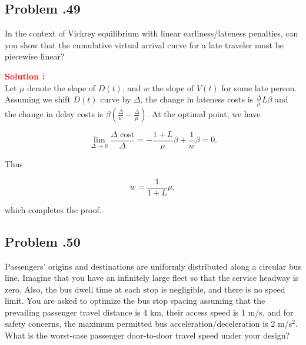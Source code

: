 \documentclass[12pt]{article}
\newcommand{\customsubsection}[1]{
  \subsection*{Problem \thesection.#1}
}
\begin{document}
\customsubsection{49}
In the context of Vickrey equilibrium with linear earliness/lateness penalties, can you show that the cumulative virtual arrival curve for a late traveler must be piecewise linear?


\textbf{\textcolor{red}{Solution :}} \\
Let \(\mu\) denote the slope of \(D(t)\), and \(w\) the slope of \(V(t)\) for some late person. Assuming we shift \(D(t)\) curve by \(\Delta\), the change in lateness costs is \(\frac{\Delta}{\mu} L \beta\) and the change in delay costs is \(\beta \left( \frac{\Delta}{w} - \frac{\Delta}{\mu} \right)\). At the optimal point, we have 

\[
\lim_{\Delta \rightarrow 0} \frac{\Delta \text{ cost}}{\Delta} = -\frac{1+L}{\mu} \beta + \frac{1}{w} \beta = 0.
\]

Thus 

\[
w = \frac{1}{1+L} \mu,
\]

which completes the proof.

\newpage

\customsubsection{50}


Passengers' origins and destinations are uniformly distributed along a circular bus line. Imagine that you have an infinitely large fleet so that the service headway is zero. Also, the bus dwell time at each stop is negligible, and there is no speed limit. You are asked to optimize the bus stop spacing assuming that the prevailing passenger travel distance is 4 km, their access speed is 1 m/s, and for safety concerns, the maximum permitted bus acceleration/deceleration is 2 m/s\(^2\). What is the worst-case passenger door-to-door travel speed under your design?
\end{document}
